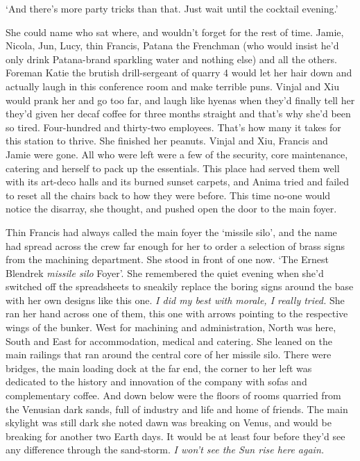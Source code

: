 `And there's more party tricks than that. Just wait until the cocktail
evening.'

She could name who sat where, and wouldn't forget for the rest of
time. Jamie, Nicola, Jun, Lucy, thin Francis, Patana the Frenchman
(who would insist he'd only drink Patana-brand sparkling water and
nothing else) and all the others. Foreman Katie the brutish
drill-sergeant of quarry 4 would let her hair down and actually laugh
in this conference room and make terrible puns. Vinjal and Xiu would
prank her and go too far, and laugh like hyenas when they'd finally
tell her they'd given her decaf coffee for three months straight and
that's why she'd been so tired. Four-hundred and thirty-two
employees. That's how many it takes for this station to thrive. She
finished her peanuts. Vinjal and Xiu, Francis and Jamie were gone. All
who were left were a few of the security, core maintenance, catering
and herself to pack up the essentials. This place had served them well
with its art-deco halls and its burned sunset carpets, and Anima tried
and failed to reset all the chairs back to how they were before. This
time no-one would notice the disarray, she thought, and pushed open
the door to the main foyer.

Thin Francis had always called the main foyer the ‘missile silo', and
the name had spread across the crew far enough for her to order a
selection of brass signs from the machining department. She stood in
front of one now. ‘The Ernest Blendrek \textit{missile silo}
Foyer'. She remembered the quiet evening when she'd switched off the
spreadsheets to sneakily replace the boring signs around the base with
her own designs like this one. \textit{I did my best with morale, I
 really tried.} She ran her hand across one of them, this one with
arrows pointing to the respective wings of the bunker. West for
machining and administration, North was here, South and East for
accommodation, medical and catering. She leaned on the main railings
that ran around the central core of her missile silo. There were
bridges, the main loading dock at the far end, the corner to her left
was dedicated to the history and innovation of the company with sofas
and complementary coffee. And down below were the floors of rooms
quarried from the Venusian dark sands, full of industry and life and
home of friends. The main skylight was still dark she noted
\textemdash{} dawn was breaking on Venus, and would be breaking for
another two Earth days. It would be at least four before they'd see
any difference through the sand-storm. \textit{I won't see the Sun
 rise here again.}

